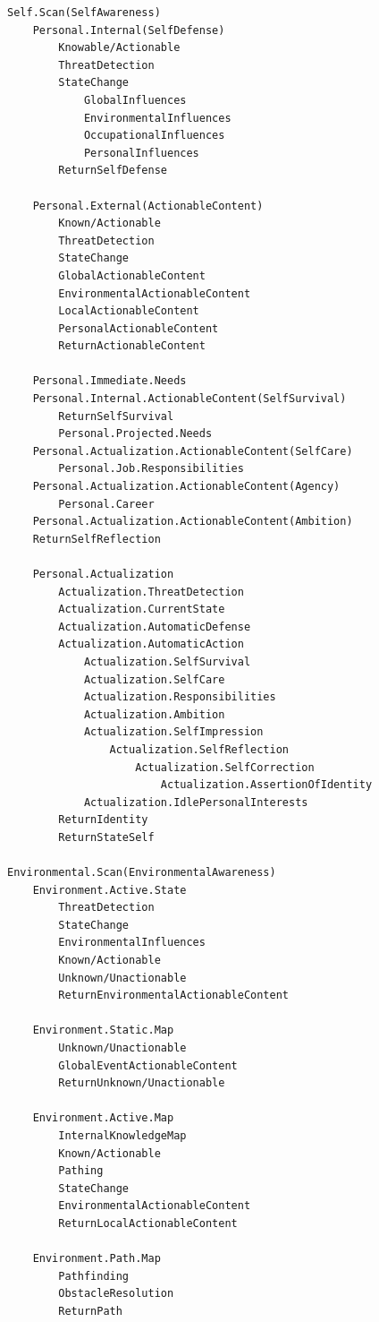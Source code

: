 \documentclass[twocolumn,10pt]{article}
\begin{document}
\begin{lstlisting}[style=conceptmap, caption={Cognitive Agentic Structure Map}]
Self.Scan(SelfAwareness)
    Personal.Internal(SelfDefense)
        Knowable/Actionable
        ThreatDetection
        StateChange
            GlobalInfluences
            EnvironmentalInfluences
            OccupationalInfluences
            PersonalInfluences
        ReturnSelfDefense

    Personal.External(ActionableContent)
        Known/Actionable
        ThreatDetection
        StateChange
        GlobalActionableContent
        EnvironmentalActionableContent
        LocalActionableContent
        PersonalActionableContent
        ReturnActionableContent

    Personal.Immediate.Needs
    Personal.Internal.ActionableContent(SelfSurvival)
        ReturnSelfSurvival
        Personal.Projected.Needs
    Personal.Actualization.ActionableContent(SelfCare)
        Personal.Job.Responsibilities
    Personal.Actualization.ActionableContent(Agency)
        Personal.Career
    Personal.Actualization.ActionableContent(Ambition)
    ReturnSelfReflection

    Personal.Actualization
        Actualization.ThreatDetection
        Actualization.CurrentState
        Actualization.AutomaticDefense
        Actualization.AutomaticAction
            Actualization.SelfSurvival
            Actualization.SelfCare
            Actualization.Responsibilities
            Actualization.Ambition
            Actualization.SelfImpression
                Actualization.SelfReflection
                    Actualization.SelfCorrection
                        Actualization.AssertionOfIdentity
            Actualization.IdlePersonalInterests
        ReturnIdentity
        ReturnStateSelf

Environmental.Scan(EnvironmentalAwareness)
    Environment.Active.State
        ThreatDetection
        StateChange
        EnvironmentalInfluences
        Known/Actionable
        Unknown/Unactionable
        ReturnEnvironmentalActionableContent

    Environment.Static.Map
        Unknown/Unactionable
        GlobalEventActionableContent
        ReturnUnknown/Unactionable

    Environment.Active.Map
        InternalKnowledgeMap
        Known/Actionable
        Pathing
        StateChange
        EnvironmentalActionableContent
        ReturnLocalActionableContent

    Environment.Path.Map
        Pathfinding
        ObstacleResolution
        ReturnPath


\end{lstlisting}
\end{document}
